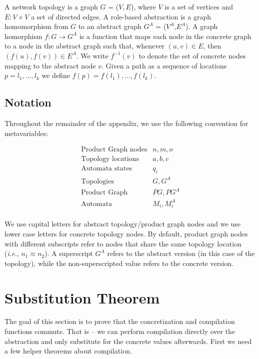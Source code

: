 \documentclass[twocolumn]{sig-alternate-10pt}
\newcommand{\IE}{\emph{i.e.}}
\begin{document}
A network topology is a graph $G$ = ($V, E$), where $V$ is a set of vertices and $E \colon V \times V$ a set of directed edges. A role-based abstraction is a graph homomorphism from $G$ to an abstract graph $G^A$ = ($V^A$,$E^A$). A graph homorphism $f : G \rightarrow G^A$ is a function that maps each node in the concrete graph to a node in the abstract graph such that, whenever $(u,v) \in E$, then $(f(u),f(v)) \in E^A$. We write $f^{-1}(v)$ to denote the set of concrete nodes mapping to the abstract node $v$. Given a path as a sequence of locations $p = l_1, \dots, l_k$ we define $f(p) = f(l_1), \dots, f(l_k)$.


\subsection{Notation}

Throughout the remainder of the appendix, we use the following convention for metavariables:

\[ \begin{array}{ll}
  \text{Product Graph nodes} & n,m,o \\
  \text{Topology locations} & a,b,c \\
  \text{Automata states} & q_i \\
  \text{Topologies} & G, G^A \\
  \text{Product Graph} & PG, PG^A \\
  \text{Automata} & M_i, M_i^A \\
\end{array} \]

We use capital letters for abstract topology/product graph nodes and we use lower case letters for concrete topology nodes. By default, product graph nodes with different subscripts refer to nodes that share the same topology location (\IE, $n_1 \approx n_2$). A superscript $G^A$ refers to the abstract version (in this case of the topology), while the non-superscripted value refers to the concrete version.


\section{Substitution Theorem}

The goal of this section is to prove that the concretization and compilation functions commute. That is -- we can perform compilation directly over the abstraction and only substitute for the concrete values afterwards. First we need a few helper theorems about compilation.
\end{document}
